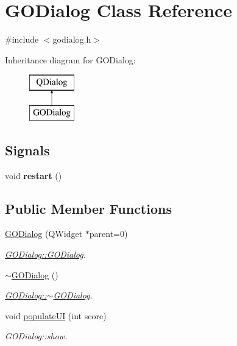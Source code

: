 \hypertarget{class_g_o_dialog}{}\section{G\+O\+Dialog Class Reference}
\label{class_g_o_dialog}


{\ttfamily \#include $<$godialog.\+h$>$}

Inheritance diagram for G\+O\+Dialog\+:\begin{figure}[H]
\begin{center}
\leavevmode
\includegraphics[height=2.000000cm]{class_g_o_dialog}
\end{center}
\end{figure}
\subsection*{Signals}
\begin{DoxyCompactItemize}
\item 
\hypertarget{class_g_o_dialog_ade3251194e62f4cd11d51deaa6d14ff8}{}void {\bfseries restart} ()\label{class_g_o_dialog_ade3251194e62f4cd11d51deaa6d14ff8}

\end{DoxyCompactItemize}
\subsection*{Public Member Functions}
\begin{DoxyCompactItemize}
\item 
\hyperlink{class_g_o_dialog_afd3447c4a8b2cd74b548cfb4b6828229}{G\+O\+Dialog} (Q\+Widget $\ast$parent=0)
\begin{DoxyCompactList}\small\item\em \hyperlink{class_g_o_dialog_afd3447c4a8b2cd74b548cfb4b6828229}{G\+O\+Dialog\+::\+G\+O\+Dialog}. \end{DoxyCompactList}\item 
\hypertarget{class_g_o_dialog_a1c2216da8ff22e04956fa0169829f3c1}{}\hyperlink{class_g_o_dialog_a1c2216da8ff22e04956fa0169829f3c1}{$\sim$\+G\+O\+Dialog} ()\label{class_g_o_dialog_a1c2216da8ff22e04956fa0169829f3c1}

\begin{DoxyCompactList}\small\item\em \hyperlink{class_g_o_dialog_a1c2216da8ff22e04956fa0169829f3c1}{G\+O\+Dialog\+::$\sim$\+G\+O\+Dialog}. \end{DoxyCompactList}\item 
void \hyperlink{class_g_o_dialog_aa3da50f6ca7030ce844c8207e4ba1bd7}{populate\+U\+I} (int score)
\begin{DoxyCompactList}\small\item\em G\+O\+Dialog\+::show. \end{DoxyCompactList}\end{DoxyCompactItemize}
